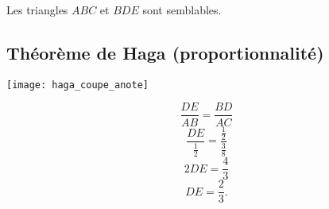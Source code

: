     \begin{center}
        Les triangles \( ABC\) et \( BDE\) sont semblables.
    \end{center}

\newpage
\subsection{Théorème de Haga (proportionnalité)}
    \begin{multicols}{2}

    \begin{center}        
        \texttt{[image: haga\_coupe\_anote]}
    \end{center}

    \begin{equation}
        \frac{ DE }{ AB }=\frac{ BD }{ AC }
    \end{equation}
    \begin{equation}
        \frac{ DE }{ \frac{ 1 }{2} }=\frac{ \frac{ 1 }{2} }{ \frac{ 3 }{ 8 } }
    \end{equation}
    \begin{equation}
        2DE=\frac{ 4 }{ 3 }
    \end{equation}
    \begin{equation}
        DE=\frac{2}{ 3 }.
    \end{equation}
    \end{multicols}
